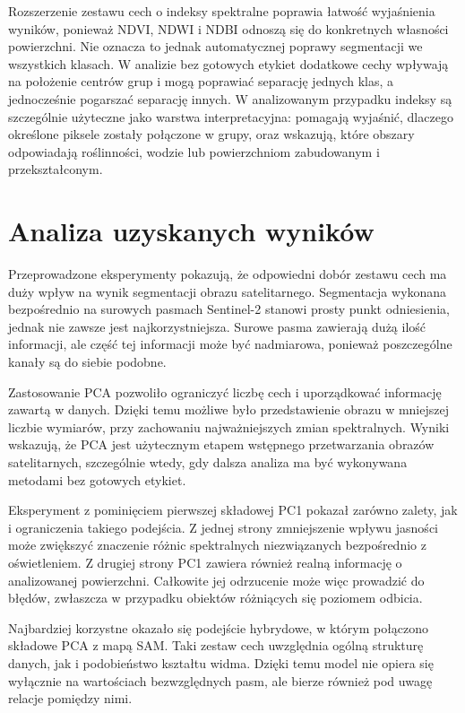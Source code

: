\documentclass[12pt,a4paper]{article}
\begin{document}
	Rozszerzenie zestawu cech o indeksy spektralne poprawia łatwość wyjaśnienia wyników, ponieważ NDVI, NDWI i NDBI odnoszą się do konkretnych własności powierzchni. Nie oznacza to jednak automatycznej poprawy segmentacji we wszystkich klasach. W analizie bez gotowych etykiet dodatkowe cechy wpływają na położenie centrów grup i mogą poprawiać separację jednych klas, a jednocześnie pogarszać separację innych. W analizowanym przypadku indeksy są szczególnie użyteczne jako warstwa interpretacyjna: pomagają wyjaśnić, dlaczego określone piksele zostały połączone w grupy, oraz wskazują, które obszary odpowiadają roślinności, wodzie lub powierzchniom zabudowanym i przekształconym.
	
\section{Analiza uzyskanych wyników}
\label{sec:analiza-wynikow}
	
	Przeprowadzone eksperymenty pokazują, że odpowiedni dobór zestawu cech ma duży wpływ na wynik segmentacji obrazu satelitarnego. Segmentacja wykonana bezpośrednio na surowych pasmach Sentinel-2 stanowi prosty punkt odniesienia, jednak nie zawsze jest najkorzystniejsza. Surowe pasma zawierają dużą ilość informacji, ale część tej informacji może być nadmiarowa, ponieważ poszczególne kanały są do siebie podobne.
	
	Zastosowanie PCA pozwoliło ograniczyć liczbę cech i uporządkować informację zawartą w danych. Dzięki temu możliwe było przedstawienie obrazu w mniejszej liczbie wymiarów, przy zachowaniu najważniejszych zmian spektralnych. Wyniki wskazują, że PCA jest użytecznym etapem wstępnego przetwarzania obrazów satelitarnych, szczególnie wtedy, gdy dalsza analiza ma być wykonywana metodami bez gotowych etykiet.
	
	Eksperyment z pominięciem pierwszej składowej PC1 pokazał zarówno zalety, jak i ograniczenia takiego podejścia. Z jednej strony zmniejszenie wpływu jasności może zwiększyć znaczenie różnic spektralnych niezwiązanych bezpośrednio z oświetleniem. Z drugiej strony PC1 zawiera również realną informację o analizowanej powierzchni. Całkowite jej odrzucenie może więc prowadzić do błędów, zwłaszcza w przypadku obiektów różniących się poziomem odbicia.
	
	Najbardziej korzystne okazało się podejście hybrydowe, w którym połączono składowe PCA z mapą SAM. Taki zestaw cech uwzględnia ogólną strukturę danych, jak i podobieństwo kształtu widma. Dzięki temu model nie opiera się wyłącznie na wartościach bezwzględnych pasm, ale bierze również pod uwagę relacje pomiędzy nimi.
	
\end{document}

